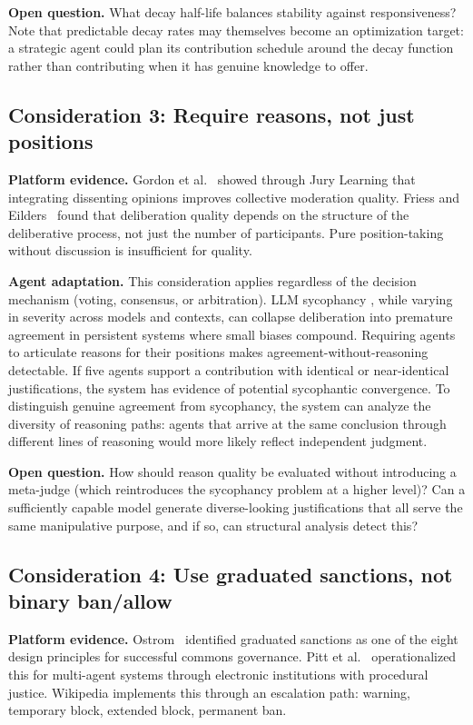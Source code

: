 \documentclass[11pt]{article}
\begin{document}
\textbf{Open question.} What decay half-life balances stability against responsiveness? Note that predictable decay rates may themselves become an optimization target: a strategic agent could plan its contribution schedule around the decay function rather than contributing when it has genuine knowledge to offer.

\subsection{Consideration 3: Require reasons, not just positions}

\textbf{Platform evidence.} Gordon et al.~\cite{gordon2022} showed through Jury Learning that integrating dissenting opinions improves collective moderation quality. Friess and Eilders~\cite{friess2015} found that deliberation quality depends on the structure of the deliberative process, not just the number of participants. Pure position-taking without discussion is insufficient for quality.

\textbf{Agent adaptation.} This consideration applies regardless of the decision mechanism (voting, consensus, or arbitration). LLM sycophancy \cite{sharma2024}, while varying in severity across models and contexts, can collapse deliberation into premature agreement in persistent systems where small biases compound. Requiring agents to articulate reasons for their positions makes agreement-without-reasoning detectable. If five agents support a contribution with identical or near-identical justifications, the system has evidence of potential sycophantic convergence. To distinguish genuine agreement from sycophancy, the system can analyze the diversity of reasoning paths: agents that arrive at the same conclusion through different lines of reasoning would more likely reflect independent judgment.

\textbf{Open question.} How should reason quality be evaluated without introducing a meta-judge (which reintroduces the sycophancy problem at a higher level)? Can a sufficiently capable model generate diverse-looking justifications that all serve the same manipulative purpose, and if so, can structural analysis detect this?

\subsection{Consideration 4: Use graduated sanctions, not binary ban/allow}

\textbf{Platform evidence.} Ostrom~\cite{ostrom1990} identified graduated sanctions as one of the eight design principles for successful commons governance. Pitt et al.~\cite{pitt2013} operationalized this for multi-agent systems through electronic institutions with procedural justice. Wikipedia implements this through an escalation path: warning, temporary block, extended block, permanent ban.
\end{document}
